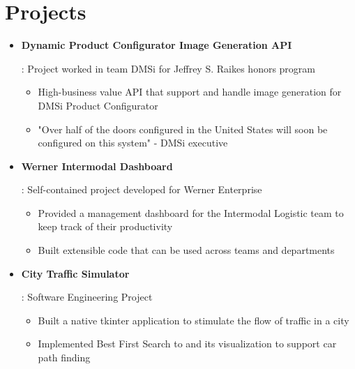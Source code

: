 \documentclass[letterpaper,10pt]{article}
\newcommand{\resumeItem}[2]{
  \item\small{
  \textbf{#1}{: #2 \vspace{-2pt}}
  }
}
\newcommand{\resumeSubItem}[2]{\resumeItem{#1}{#2}\vspace{-4pt}}
\newcommand{\resumeSubHeadingListStart}{\begin{itemize}[leftmargin=*] %
}
\newcommand{\resumeSubHeadingListEnd}{\end{itemize}}
\newcommand{\shorterSection}[1]{\vspace{-10pt}\section{\textcolor{heading-lightblue}{\textbf{\Large #1}}}}
\begin{document}
\shorterSection{Projects}
  \resumeSubHeadingListStart
  \resumeSubItem{Dynamic Product Configurator Image Generation API}
  {Project worked in team DMSi for Jeffrey S. Raikes honors program
    \vspace{-5pt}
    \begin{itemize}
      \item High-business value API that support and handle image generation for DMSi Product Configurator
      \item "Over half of the doors configured in the United States will soon be configured on this system" - DMSi executive
    \end{itemize}
  }
  \resumeSubItem{Werner Intermodal Dashboard}
  {Self-contained project developed for Werner Enterprise
    \vspace{-5pt}
    \begin{itemize}
      \item Provided a management dashboard for the Intermodal Logistic team to keep track of their productivity
      \item Built extensible code that can be used across teams and departments
    \end{itemize}
  }
  \resumeSubItem{City Traffic Simulator}{Software Engineering Project
    \vspace{-5pt}
    \begin{itemize}
      \item Built a native tkinter application to stimulate the flow of traffic in a city
      \item Implemented Best First Search to and its visualization to support car path finding
    \end{itemize}
  }
  \resumeSubHeadingListEnd
\end{document}
